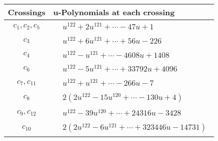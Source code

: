 \documentclass[1p]{elsarticle_modified}
\theoremstyle{definition}
\begin{document}
\begin{tabular}{m{50pt}|m{274pt}}
Crossings & \hspace{64pt}u-Polynomials at each crossing \\
\hline $$\begin{aligned}c_{1},c_{2},c_{5}\end{aligned}$$&$\begin{aligned}
&u^{122}+2 u^{121}+\cdots-47 u+1
\end{aligned}$\\
\hline $$\begin{aligned}c_{3}\end{aligned}$$&$\begin{aligned}
&u^{122}+6 u^{121}+\cdots+56 u-226
\end{aligned}$\\
\hline $$\begin{aligned}c_{4}\end{aligned}$$&$\begin{aligned}
&u^{122}- u^{121}+\cdots-4608 u+1408
\end{aligned}$\\
\hline $$\begin{aligned}c_{6}\end{aligned}$$&$\begin{aligned}
&u^{122}-5 u^{121}+\cdots+33792 u+4096
\end{aligned}$\\
\hline $$\begin{aligned}c_{7},c_{11}\end{aligned}$$&$\begin{aligned}
&u^{122}+u^{121}+\cdots-266 u-7
\end{aligned}$\\
\hline $$\begin{aligned}c_{8}\end{aligned}$$&$\begin{aligned}
&2(2 u^{122}-15 u^{120}+\cdots-130 u+4)
\end{aligned}$\\
\hline $$\begin{aligned}c_{9},c_{12}\end{aligned}$$&$\begin{aligned}
&u^{122}-39 u^{120}+\cdots+24316 u-3428
\end{aligned}$\\
\hline $$\begin{aligned}c_{10}\end{aligned}$$&$\begin{aligned}
&2(2 u^{122}-6 u^{121}+\cdots+323446 u-14731)
\end{aligned}$\\
\hline
\end{tabular}\\~\\
\end{document}
